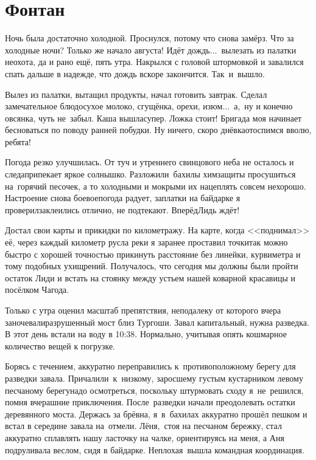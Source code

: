\chapter{Фонтан}
\vepsianrose

Ночь была достаточно холодной. Проснулся, потому что снова замёрз. Что за холодные ночи? Только же начало августа! Идёт дождь$\ldots$~вылезать из палатки неохота, да и рано ещё, пять утра. Накрылся с головой штормовкой и завалился спать дальше в надежде, что дождь вскоре закончится. Так~и~вышло. 

Вылез из палатки, вытащил продукты, начал готовить завтрак. Сделал замечательное блюдо\mdash сухое молоко, сгущёнка, орехи, изюм$\ldots$~а,~ну и конечно овсянка, чуть не~забыл. Каша вышла\mdash супер. Ложка стоит! Бригада моя начинает бесноваться по поводу ранней побудки. Ну ничего, скоро днёвка\mdash отоспимся вволю, ребята! 

Погода резко улучшилась. От туч и утреннего свинцового неба не осталось и следа\mdash припекает яркое солнышко. Разложили~бахилы химзащиты просушиться на~горячий песочек, а то холодными и мокрыми их нацеплять совсем нехорошо. Настроение снова боевое\mdash погода радует, заплатки на байдарке я проверил\mdash заклеились отлично, не подтекают. Вперёд\mdash Лидь ждёт! 

Достал свои карты и прикидки по километражу. На карте, когда <<поднимал>> её, через каждый километр русла реки я заранее проставил точки\mdash так можно быстро с хорошей точностью прикинуть расстояние без линейки, курвиметра и тому подобных ухищрений. Получалось, что сегодня мы должны были пройти остаток Лиди и встать на стоянку между устьем нашей коварной красавицы и посёлком Чагода.

Только с утра оценил масштаб препятствия, неподалеку от которого вчера заночевали\mdash разрушенный мост близ Тургоши. Завал капитальный, нужна разведка. В этот день встали на воду в 10:38. Нормально, учитывая опять кошмарное количество вещей к погрузке. 

Борясь с течением, аккуратно переправились к~противоположному берегу для разведки завала. Причалили~к~низкому, заросшему густым кустарником левому песчаному берегу\mdash надо осмотреться, поскольку штурмовать сходу я~не~решился, помня вчерашние приключения. После~разведки начали преодолевать остатки деревянного моста. Держась за брёвна, я~в~бахилах аккуратно прошёл пешком и встал в середине завала на~отмели. Лёня,~стоя на песчаном бережку, стал аккуратно сплавлять нашу ласточку на чалке, ориентируясь на меня, а Аня подруливала веслом, сидя в байдарке. Неплохая~вышла командная координация. 

